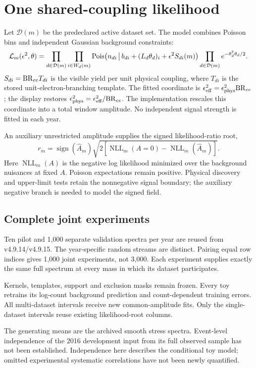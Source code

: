 \documentclass[11pt]{article}
\begin{document}
\clearpage
\section{One shared-coupling likelihood}
Let $\mathcal D(m)$ be the predeclared active dataset set. The model combines Poisson bins and independent Gaussian background constraints:
\[
 \mathcal L_m(\epsilon^2,\theta)=
 \prod_{d\in\mathcal D(m)}\prod_{i\in W_d(m)}
 {\rm Pois}\!\left(n_{di}\,\middle|\,b_{di}+(L_d\theta_d)_i+
                   \epsilon^2 S_{di}(m)\right)
 \prod_{d\in\mathcal D(m)} e^{-\theta_d^{\mathsf T}\theta_d/2}.
\]
$S_{di}={\rm BR}_{ee}T_{di}$ is the visible yield per unit physical coupling, where $T_{di}$ is the stored unit-electron-branching template. The fitted coordinate is $\epsilon_{\rm eff}^2=\epsilon_{\rm phys}^2{\rm BR}_{ee}$; the display restores $\epsilon_{\rm phys}^2=\epsilon_{\rm eff}^2/{\rm BR}_{ee}$. The implementation rescales this coordinate into a total window amplitude. No independent signal strength is fitted in each year.

An auxiliary unrestricted amplitude supplies the signed likelihood-ratio root,
\[
 r_m=\operatorname{sign}(\widehat A_m)
 \sqrt{2\left[\operatorname{NLL}_m(A=0)-\operatorname{NLL}_m(\widehat A_m)\right]}.
\]
Here $\operatorname{NLL}_m(A)$ is the negative log likelihood minimized over the background nuisances at fixed $A$. Poisson expectations remain positive. Physical discovery and upper-limit tests retain the nonnegative signal boundary; the auxiliary negative branch is needed to model the signed field.

\subsection*{Complete joint experiments}
Ten pilot and 1,000 separate validation spectra per year are reused from v4.9.14/v4.9.15. The year-specific random streams are distinct. Pairing equal row indices gives 1,000 joint experiments, not 3,000. Each experiment supplies exactly the same full spectrum at every mass in which its dataset participates.

Kernels, templates, support and exclusion masks remain frozen. Every toy retrains its log-count background prediction and count-dependent training errors. All multi-dataset intervals receive new common-amplitude fits. Only the single-dataset intervals reuse existing likelihood-root columns.

The generating means are the archived smooth stress spectra. Event-level independence of the 2016 development input from its full observed sample has not been established. Independence here describes the conditional toy model; omitted experimental systematic correlations have not been newly quantified.
\end{document}
